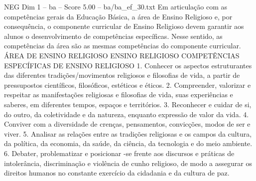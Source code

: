 \begin{textsample}{NEG Dim 1 – ba – Score 5.00 – ba/ba\_ef\_30.txt}  \label{ex:f1_neg_188}
Em articulação com as competências gerais da Educação Básica, a área de Ensino Religioso e, por consequência, o componente curricular de Ensino Religioso devem garantir aos alunos o desenvolvimento de competências específicas.
Nesse sentido, as competências da área são as mesmas competências do componente curricular.
ÁREA DE ENSINO RELIGIOSO ENSINO RELIGIOSO COMPETÊNCIAS ESPECÍFICAS DE ENSINO RELIGIOSO 1.
Conhecer os aspectos estruturantes das diferentes tradições/movimentos religiosos e filosofias de vida, a partir de pressupostos científicos, filosóficos, estéticos e éticos. 2.
Compreender, valorizar e respeitar as manifestações religiosas e filosofias de vida, suas experiências e saberes, em diferentes tempos, espaços e territórios. 3.
Reconhecer e cuidar de si, do outro, da coletividade e da natureza, enquanto expressão de valor da vida. 4.
Conviver com a diversidade de crenças, pensamentos, convicções, modos de ser e viver. 5.
Analisar as relações entre as tradições religiosas e os campos da cultura, da política, da economia, da saúde, da ciência, da tecnologia e do meio ambiente. 6.
Debater, problematizar e posicionar -se frente aos discursos e práticas de intolerância, discriminação e violência de cunho religioso, de modo a assegurar os direitos humanos no constante exercício da cidadania e da cultura de paz.

\end{textsample}
